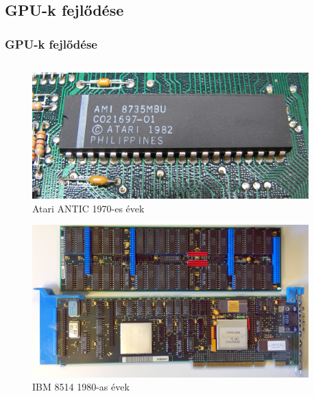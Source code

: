 \documentclass[tikz,border=10pt]{beamer}
\begin{document}
\subsection{GPU-k fejlődése}
\begin{frame}
\frametitle{GPU-k fejlődése}
\transwipe[direction=90]
\begin{columns}[onlytextwidth]
\begin{column}{0.5\textwidth}
\centering

\begin{figure}
\includegraphics[scale=.14]{media/antic}
\caption{Atari ANTIC 1970-es évek}
\end{figure}

\begin{figure}
\includegraphics[scale=.0715]{media/ibm}
\caption{IBM 8514 1980-as évek}
\end{figure}

\end{column}
\begin{column}{0.5\textwidth}
\centering


\end{column}
\end{columns}
\end{frame}
\end{document}
